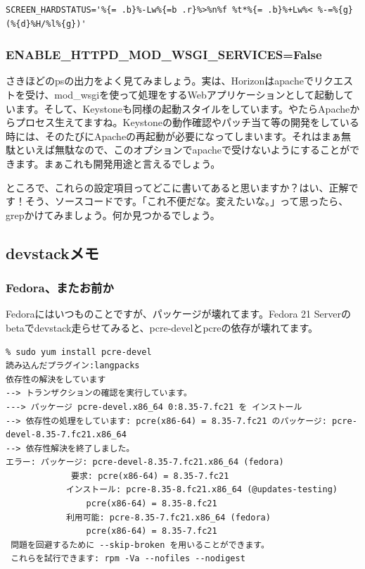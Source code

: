\documentclass[9pt,b5paper,tombo,openany,dvipdfmx]{jsbook}
\begin{document}
\begin{lstlisting}
SCREEN_HARDSTATUS='%{= .b}%-Lw%{=b .r}%>%n%f %t*%{= .b}%+Lw%< %-=%{g}(%{d}%H/%l%{g})'
\end{lstlisting}

\subsubsection{ENABLE\_HTTPD\_MOD\_WSGI\_SERVICES=False}

さきほどのpsの出力をよく見てみましょう。実は、Horizonはapacheでリクエストを受け、mod\_wsgiを使って処理をするWebアプリケーションとして起動しています。そして、Keystoneも同様の起動スタイルをしています。やたらApacheからプロセス生えてますね。Keystoneの動作確認やパッチ当て等の開発をしている時には、そのたびにApacheの再起動が必要になってしまいます。それはまぁ無駄といえば無駄なので、このオプションでapacheで受けないようにすることができます。まぁこれも開発用途と言えるでしょう。

ところで、これらの設定項目ってどこに書いてあると思いますか？はい、正解です！そう、ソースコードです。「これ不便だな。変えたいな。」って思ったら、grepかけてみましょう。何か見つかるでしょう。

\subsection{devstackメモ}

\subsubsection{Fedora、またお前か}

Fedoraにはいつものことですが、パッケージが壊れてます。Fedora 21 Serverのbetaでdevstack走らせてみると、pcre-develとpcreの依存が壊れてます。

\begin{lstlisting}
% sudo yum install pcre-devel
読み込んだプラグイン:langpacks
依存性の解決をしています
--> トランザクションの確認を実行しています。
---> パッケージ pcre-devel.x86_64 0:8.35-7.fc21 を インストール
--> 依存性の処理をしています: pcre(x86-64) = 8.35-7.fc21 のパッケージ: pcre-devel-8.35-7.fc21.x86_64
--> 依存性解決を終了しました。
エラー: パッケージ: pcre-devel-8.35-7.fc21.x86_64 (fedora)
             要求: pcre(x86-64) = 8.35-7.fc21
            インストール: pcre-8.35-8.fc21.x86_64 (@updates-testing)
                pcre(x86-64) = 8.35-8.fc21
            利用可能: pcre-8.35-7.fc21.x86_64 (fedora)
                pcre(x86-64) = 8.35-7.fc21
 問題を回避するために --skip-broken を用いることができます。
 これらを試行できます: rpm -Va --nofiles --nodigest
\end{lstlisting}
\end{document}

